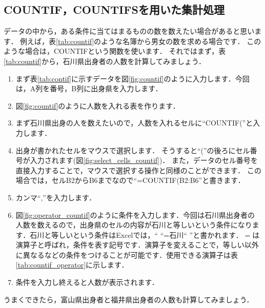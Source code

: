 \subsection{COUNTIF，COUNTIFSを用いた集計処理}

データの中から，ある条件に当てはまるものの数を数えたい場合があると思います．
例えば，表\ref{tab:countif}のような名簿から男女の数を求める場合です．
このような場合は，COUNTIFという関数を使います．
それではまず，表\ref{tab:countif}から，石川県出身者の人数を計算してみましょう．
\begin{enumerate}
    \item まず表\ref{tab:contif}に示すデータを図\ref{fig:countif}のように入力します．今回は，A列を番号，B列に出身県を入力します．
    \item 図\ref{fig:countif}のように人数を入れる表を作ります．
    \item まず石川県出身の人を数えたいので，人数を入れるセルに``COUNTIF(''と入力します．
    \item 出身が書かれたセルをマウスで選択します．
    そうすると``(''の後ろにセル番号が入力されます(図\ref{fig:select_cells_countif})．
    また，データのセル番号を直接入力することで，マウスで選択する操作と同様のことができます．
    この場合では，セルB2からB6までなので``=COUNTIF(B2:B6''と書きます．
    \item カンマ``,''を入力します．
    \item 図\ref{fig:operator_countif}のように条件を入力します．今回は石川県出身者の人数を数えるので，出身県のセルの内容が石川と等しいという条件になります．石川と等しいという条件はExcelでは，`` ``=石川`` ''と書かれます．$=$は演算子と呼ばれ，条件を表す記号です．演算子を変えることで，等しい以外に異なるなどの条件をつけることが可能です．使用できる演算子は表\ref{tab:countif_operator}に示します．
    \item 条件を入力し終えると人数が表示されます．
\end{enumerate}
うまくできたら，富山県出身者と福井県出身者の人数も計算してみましょう．

